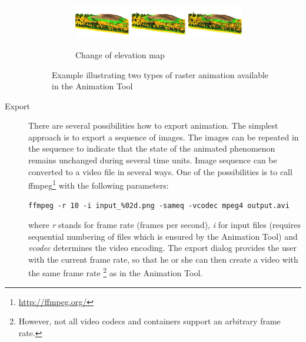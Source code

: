 \documentclass[a4paper,12pt,oneside]{book}
\newcommand{\at}{Animation Tool\xspace}
\begin{document}
\begin{description}
\begin{figure}[ht]
        \begin{subfigure}[h]{\textwidth}
        \centering
        \includegraphics[width=0.3\textwidth]{./images/elevation_map1.png}
        \includegraphics[width=0.3\textwidth]{./images/elevation_map2.png}
        \includegraphics[width=0.3\textwidth]{./images/elevation_map3.png}
        \caption{Change of elevation map}
        \label{fig:elevation_map}
        \end{subfigure}
        \caption{Example illustrating two types of raster animation available in the \at}
        \label{fig:color_elevation_map}
    \end{figure}

    \item[Export]
    There are several possibilities how to export animation.
    The simplest approach is to export a sequence of images.
    The images can be repeated in the sequence to indicate
    that the state of the animated phenomenon remains unchanged during several time units.
    Image sequence can be converted to a video file in several ways.
    One of the possibilities is to call ffmpeg\footnote{\url{http://ffmpeg.org/}}
    with the following parameters:

    \begin{footnotesize}
    \begin{lstlisting}[style=mybash]
ffmpeg -r 10 -i input_%02d.png -sameq -vcodec mpeg4 output.avi
    \end{lstlisting}
    \end{footnotesize}
      where \emph{r} stands for frame rate (frames per second),
      \emph{i} for input files (requires sequential numbering of files which is ensured by the \at) and
      \emph{vcodec} determines the video encoding.
      The export dialog provides the user with the current frame rate, so that he or she can then create
      a video with the same frame rate%
      \footnote{However, not all video codecs and containers support an arbitrary frame rate.} as in the \at.


\end{description}
\end{document}
